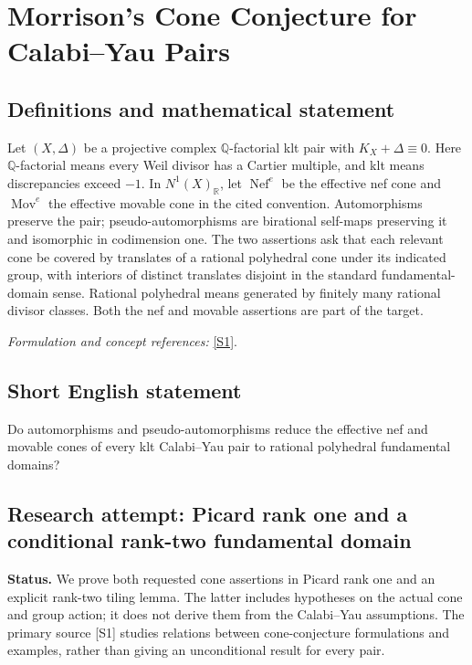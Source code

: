 \documentclass[11pt]{article}
\begin{document}
\section*{\texorpdfstring{Morrison’s Cone Conjecture for Calabi–Yau Pairs}{Morrison’s Cone Conjecture for Calabi–Yau Pairs}}\label{30001574}
\subsection{Definitions and mathematical statement}
Let $(X,\Delta)$ be a projective complex ${\mathbb{Q}}$-factorial klt pair with $K_X+\Delta\equiv0$. Here ${\mathbb{Q}}$-factorial means every Weil divisor has a Cartier multiple, and klt means discrepancies exceed $-1$. In $N^1(X)_{{\mathbb{R}}}$, let $\operatorname{Nef}^e$ be the effective nef cone and $\operatorname{Mov}^e$ the effective movable cone in the cited convention. Automorphisms preserve the pair; pseudo-automorphisms are birational self-maps preserving it and isomorphic in codimension one. The two assertions ask that each relevant cone be covered by translates of a rational polyhedral cone under its indicated group, with interiors of distinct translates disjoint in the standard fundamental-domain sense. Rational polyhedral means generated by finitely many rational divisor classes. Both the nef and movable assertions are part of the target.
\par\smallskip\textit{Formulation and concept references:} \href{https://arxiv.org/abs/2406.07307}{[S1]}.

\subsection{Short English statement}
Do automorphisms and pseudo-automorphisms reduce the effective nef and movable cones of every klt Calabi–Yau pair to rational polyhedral fundamental domains?
\subsection{Research attempt: Picard rank one and a conditional rank-two fundamental domain}
\textbf{Status.} We prove both requested cone assertions in Picard rank one and an explicit rank-two tiling lemma. The latter includes hypotheses on the actual cone and group action; it does not derive them from the Calabi--Yau assumptions. The primary source [S1] studies relations between cone-conjecture formulations and examples, rather than giving an unconditional result for every pair.
\end{document}
